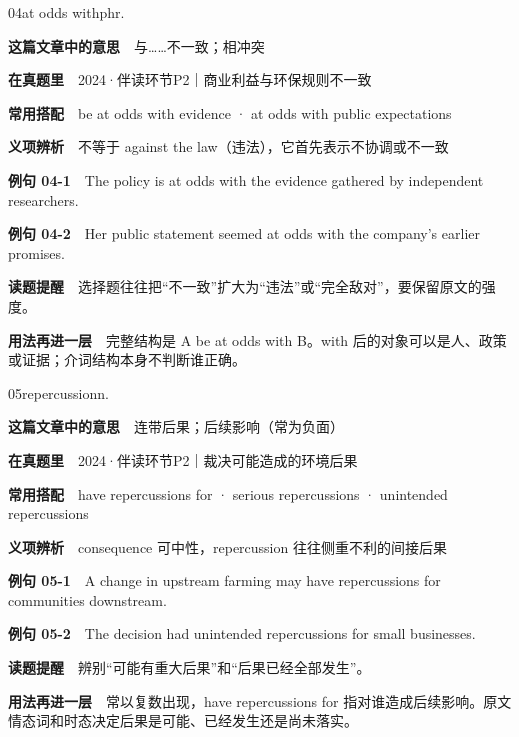 \documentclass[a4paper,11pt,openany]{report}
\newcommand{\emphasislabel}[1]{\textcolor{leaf}{\CJKsf\bfseries #1}}
\begin{document}
\begin{vocabbox}{04}{at odds with}{phr.}

\textbf{这篇文章中的意思}　与\ldots\ldots 不一致；相冲突

\textbf{在真题里}　2024·伴读环节P2｜商业利益与环保规则不一致

\textbf{常用搭配}　be at odds with evidence · at odds with public expectations

\textbf{义项辨析}　不等于 against the law（违法），它首先表示不协调或不一致

\textbf{例句 04-1}　The policy is at odds with the evidence gathered by independent researchers.

\textbf{例句 04-2}　Her public statement seemed at odds with the company's earlier promises.

\emphasislabel{读题提醒}　选择题往往把``不一致''扩大为``违法''或``完全敌对''，要保留原文的强度。

\textbf{用法再进一层}　完整结构是 A be at odds with B。with 后的对象可以是人、政策或证据；介词结构本身不判断谁正确。

\end{vocabbox}

\begin{vocabbox}{05}{repercussion}{n.}

\textbf{这篇文章中的意思}　连带后果；后续影响（常为负面）

\textbf{在真题里}　2024·伴读环节P2｜裁决可能造成的环境后果

\textbf{常用搭配}　have repercussions for · serious repercussions · unintended repercussions

\textbf{义项辨析}　consequence 可中性，repercussion 往往侧重不利的间接后果

\textbf{例句 05-1}　A change in upstream farming may have repercussions for communities downstream.

\textbf{例句 05-2}　The decision had unintended repercussions for small businesses.

\emphasislabel{读题提醒}　辨别``可能有重大后果''和``后果已经全部发生''。

\textbf{用法再进一层}　常以复数出现，have repercussions for 指对谁造成后续影响。原文情态词和时态决定后果是可能、已经发生还是尚未落实。

\end{vocabbox}
\end{document}
